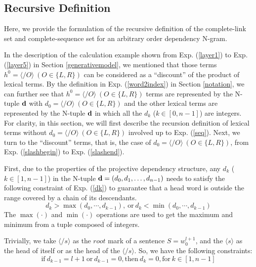 \documentclass[english]{jnlp_1.4}
\begin{document}
\subsection{Recursive Definition}
\label{defination}

Here, we provide the formulation of the recursive definition of the complete-link set and complete-sequence set for an arbitrary order dependency N-gram.

In the description of the calculation example shown from Exp. (\ref{layer1}) to Exp. (\ref{layer5}) in Section \ref{generativemodel}, we mentioned that those terms $h^0 = \langle \slash O \rangle\ (O \in \{L, R\})$ can be considered as a ``discount'' of the product of lexical terms. By the definition in Exp. (\ref{word2index}) in Section \ref{notation}, we can further see that $h^0 = \langle \slash O \rangle\ (O \in \{L, R\})$ terms are represented by the N-tuple ${\bf{d}}$ with $d_0 = \langle \slash O \rangle\ (O \in \{L, R\})$ and the other lexical terms are represented by the N-tuple ${\bf{d}}$ in which all the $d_k$ ($k \in [0,n-1]$) are integers. For clarity, in this section, we will first describe the recursion definition of lexical terms without $d_0 = \langle \slash O \rangle\ (O \in \{L, R\})$ involved up to Exp. (\ref{seq}). Next, we turn to the ``discount'' terms, that is, the case of  $d_0 = \langle \slash O \rangle\ (O \in \{L, R\})$, from Exp. (\ref{slashbegin}) to Exp. (\ref{slashend}).

First, due to the properties of the projective dependency structure, any $d_k$ ($k \in [1,n-1]$) in the N-tuple ${\bf{d}} = (d_0, d_1, \dots, d_{n-1})$ needs to satisfy the following constraint of Exp. (\ref{dk}) to guarantee that a head word is outside the range covered by a chain of its descendants. 
\begin{equation}
d_{k} > \max (d_0, \cdots, d_{k-1}),\ \text{or}\ d_{k} < \min (d_0, \cdots, d_{k-1})
\label{dk}
\end{equation}
The $\max (\cdot)$ and $\min (\cdot)$ operations are used to get the maximum and minimum from a tuple composed of integers.

Trivially, we take $\langle \slash s \rangle$ as the $root$ mark of a sentence $S=w_{0}^{l+1}$, and the $\langle s \rangle$ as the head of itself or as the head of the $\langle \slash s \rangle$. So, we have the following constraints:
\begin{equation}
\text{if}\ d_{k-1} = l+1\ \text{or}\ d_{k-1} = 0, \text{then}\ d_{k} = 0, \text{for}\ k \in [1, n-1]
\end{equation} 
\end{document}
